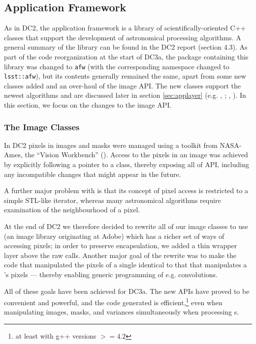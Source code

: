 \subsection{Application Framework}

As in DC2, the application framework is a library of
scientifically-oriented C++ classes that support the development of
astronomical processing algorithms.  A general summary of the library
can be found in the DC2 report (section 4.3).  As part of the code
reorganization at the start of DC3a, the package containing this
library was changed to {\tt afw} (with the corresponding namespace 
changed to {\tt lsst::afw}), but its contents generally remained the
same, apart from some new classes added and an over-haul of the image
API.  The new classes support the newest algorithms and are discussed
later in section \ref{sec:applayer} (e.g. ,
; , ).  In this section, we
focus on the changes to the image API.  

\subsubsection{The Image Classes}
\label{secImageClasses}

In DC2 pixels in images and masks were managed using a toolkit from NASA-Ames, the ``Vision Workbench'' ().
Access to the pixels in an image was achieved by explicitly following a pointer to a  class,
thereby exposing all of  API, including any incompatible changes that might appear in
the future.

A further major problem with  is that its concept of pixel access is restricted to a simple
STL-like iterator, whereas many astronomical algorithms require examination of the neighbourhood of
a pixel.

At the end of DC2 we therefore decided to rewrite all of our image classes to use 
(an image library originating at Adobe) which has a richer set of ways of accessing pixels;  in
order to preserve encapsulation, we added a thin wrapper layer above the raw  calls.
Another major goal of the rewrite was to make the code that manipulated the pixels of a single
 identical to that that manipulates a 's pixels --- thereby enabling
generic programming of e.g. convolutions.

All of these goals have been achieved for DC3a.  The new APIs have proved to be convenient and
powerful, and the code generated is efficient,\footnote{at least with g++ versions $>= 4.2$} even when
manipulating images, masks, and variances simultaneously when processing s.


